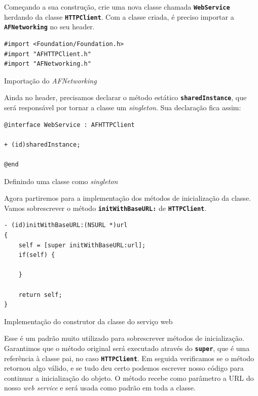 \documentclass[a4paper,12pt,brazil,oneside]{book}
\begin{document}
Começando a sua construção, crie uma nova classe chamada \texttt{\textbf{WebService}} herdando da classe \texttt{\textbf{HTTPClient}}. Com a classe criada, é preciso importar a \texttt{\textbf{AFNetworking}} no seu header.

\begin{listing}[H]
\begin{verbatim}
#import <Foundation/Foundation.h>
#import "AFHTTPClient.h"
#import "AFNetworking.h"
\end{verbatim}
\caption{Importação do \emph{AFNetworking}}
\end{listing}


Ainda no header, precisamos declarar o método estático \texttt{\textbf{sharedInstance}}, que será responsável por tornar a classe um \emph{singleton}. Sua declaração fica assim:

\begin{listing}[H]
\begin{verbatim}
@interface WebService : AFHTTPClient

+ (id)sharedInstance;

@end
\end{verbatim}
\caption{Definindo uma classe como \emph{singleton}}
\end{listing}


Agora partiremos para a implementação dos métodos de inicialização da classe. Vamos sobrescrever o método \texttt{\textbf{initWithBaseURL:}} de \texttt{\textbf{HTTPClient}}.

\begin{listing}[H]
\begin{verbatim}
- (id)initWithBaseURL:(NSURL *)url
{
    self = [super initWithBaseURL:url];
    if(self) {
    
    }
    
    return self;
}
\end{verbatim}
\caption{Implementação do construtor da classe do serviço web}
\end{listing}


Esse é um padrão muito utilizado para sobrescrever métodos de inicialização. Garantimos que o método original será executado através do \texttt{\textbf{super}}, que é uma referência à classe pai, no caso  \texttt{\textbf{HTTPClient}}. Em seguida verificamos se o método retornou algo válido, e se tudo deu certo podemos escrever nosso código para continuar a inicialização do objeto. O método recebe como parâmetro a URL do nosso \emph{web service} e será usada como padrão em toda a classe.
\end{document}

